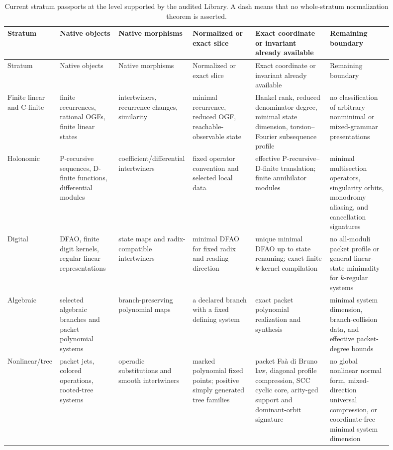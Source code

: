 \documentclass[11pt]{article}
\theoremstyle{definition}
\theoremstyle{remark}
\begin{document}
\begin{landscape}
\scriptsize
\begin{longtable}{@{}L{0.095\linewidth}L{0.15\linewidth}L{0.135\linewidth}L{0.165\linewidth}L{0.19\linewidth}L{0.165\linewidth}@{}}
\caption{Current stratum passports at the level supported by the audited Library.  A dash means that no whole-stratum normalization theorem is asserted.}
\label{tab:stratum-passports}\\
\toprule
Stratum & Native objects & Native morphisms & Normalized or exact slice & Exact coordinate or invariant already available & Remaining boundary\\
\midrule
\endfirsthead
\toprule
Stratum & Native objects & Native morphisms & Normalized or exact slice & Exact coordinate or invariant already available & Remaining boundary\\
\midrule
\endhead
Finite linear and C-finite & finite recurrences, rational OGFs, finite linear states & intertwiners, recurrence changes, similarity & minimal recurrence, reduced OGF, reachable-observable state & Hankel rank, reduced denominator degree, minimal state dimension, torsion--Fourier subsequence profile & no classification of arbitrary nonminimal or mixed-grammar presentations\\
Holonomic & P-recursive sequences, D-finite functions, differential modules & coefficient/differential intertwiners & fixed operator convention and selected local data & effective P-recursive--D-finite translation; finite annihilator modules & minimal multisection operators, singularity orbits, monodromy aliasing, and cancellation signatures\\
Digital & DFAO, finite digit kernels, regular linear representations & state maps and radix-compatible intertwiners & minimal DFAO for fixed radix and reading direction & unique minimal DFAO up to state renaming; exact finite \(k\)-kernel compilation & no all-moduli packet profile or general linear-state minimality for \(k\)-regular systems\\
Algebraic & selected algebraic branches and packet polynomial systems & branch-preserving polynomial maps & a declared branch with a fixed defining system & exact packet polynomial realization and synthesis & minimal system dimension, branch-collision data, and effective packet-degree bounds\\
Nonlinear/tree & packet jets, colored operations, rooted-tree systems & operadic substitutions and smooth intertwiners & marked polynomial fixed points; positive simply generated tree families & packet Fa\`a di Bruno law, diagonal profile compression, SCC cyclic core, arity-gcd support and dominant-orbit signature & no global nonlinear normal form, mixed-direction universal compression, or coordinate-free minimal system dimension\\

\end{longtable}
\end{landscape}
\end{document}
